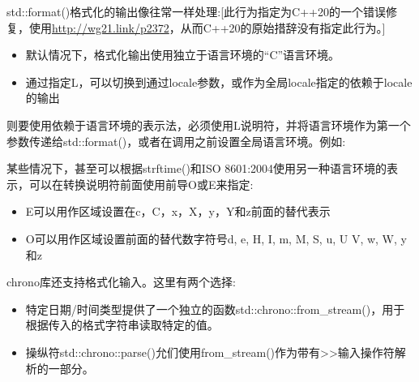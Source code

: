 std::format()格式化的输出像往常一样处理:[此行为指定为C++20的一个错误修复，使用\url{http://wg21.link/p2372}，从而C++20的原始措辞没有指定此行为。]

\begin{itemize}
\item
默认情况下，格式化输出使用独立于语言环境的“C”语言环境。

\item
通过指定L，可以切换到通过locale参数，或作为全局locale指定的依赖于locale的输出
\end{itemize}

则要使用依赖于语言环境的表示法，必须使用L说明符，并将语言环境作为第一个参数传递给std::format()，或者在调用之前设置全局语言环境。例如:


某些情况下，甚至可以根据strftime()和ISO 8601:2004使用另一种语言环境的表示，可以在转换说明符前面使用前导O或E来指定:

\begin{itemize}
\item
E可以用作区域设置在c，C，x，X，y，Y和z前面的替代表示

\item
O可以用作区域设置前面的替代数字符号d, e, H, I, m, M, S, u, U V, w, W, y和z
\end{itemize}


chrono库还支持格式化输入。这里有两个选择:

\begin{itemize}
\item
特定日期/时间类型提供了一个独立的函数std::chrono::from\_stream()，用于根据传入的格式字符串读取特定的值。

\item
操纵符std::chrono::parse()允们使用from\_stream()作为带有>{}>输入操作符解析的一部分。
\end{itemize}

